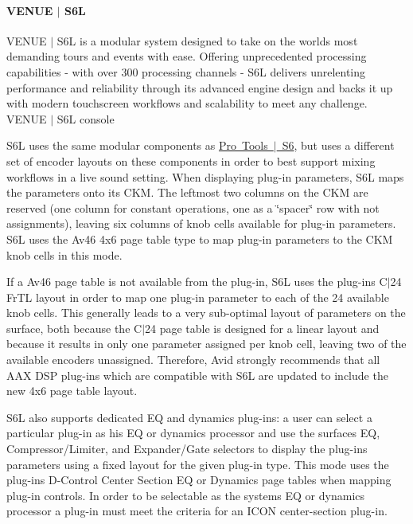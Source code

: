\hypertarget{a00833_subsubsection__venue_s6l}{}\paragraph{V\+E\+N\+U\+E $\vert$ S6L}\label{a00833_subsubsection__venue_s6l}
V\+E\+N\+UE $\vert$ S6L is a modular system designed to take on the world\textquotesingle{}s most demanding tours and events with ease. Offering unprecedented processing capabilities -\/ with over 300 processing channels -\/ S6L delivers unrelenting performance and reliability through its advanced engine design and backs it up with modern touchscreen workflows and scalability to meet any challenge.   V\+E\+N\+UE $\vert$ S6L console 

S6L uses the same modular components as \mbox{\hyperlink{a00833_subsubsection__avid_s6}{Pro Tools $\vert$ S6}}, but uses a different set of encoder layouts on these components in order to best support mixing workflows in a live sound setting. When displaying plug-\/in parameters, S6L maps the parameters onto its C\+KM. The leftmost two columns on the C\+KM are reserved (one column for constant operations, one as a \char`\"{}spacer\char`\"{} row with not assignments), leaving six columns of knob cells available for plug-\/in parameters. S6L uses the {\ttfamily \textquotesingle{}Av46\textquotesingle{}} 4x6 page table type to map plug-\/in parameters to the C\+KM knob cells in this mode.

If a {\ttfamily \textquotesingle{}Av46\textquotesingle{}} page table is not available from the plug-\/in, S6L uses the plug-\/in\textquotesingle{}s C$\vert$24 {\ttfamily \textquotesingle{}Fr\+TL\textquotesingle{}} layout in order to map one plug-\/in parameter to each of the 24 available knob cells. This generally leads to a very sub-\/optimal layout of parameters on the surface, both because the C$\vert$24 page table is designed for a linear layout and because it results in only one parameter assigned per knob cell, leaving two of the available encoders unassigned. Therefore, Avid strongly recommends that all A\+AX D\+SP plug-\/ins which are compatible with S6L are updated to include the new 4x6 page table layout.

S6L also supports dedicated EQ and dynamics plug-\/ins\+: a user can select a particular plug-\/in as his EQ or dynamics processor and use the surface\textquotesingle{}s EQ, Compressor/\+Limiter, and Expander/\+Gate selectors to display the plug-\/in\textquotesingle{}s parameters using a fixed layout for the given plug-\/in type. This mode uses the plug-\/in\textquotesingle{}s D-\/\+Control Center Section EQ or Dynamics page tables when mapping plug-\/in controls. In order to be selectable as the system\textquotesingle{}s EQ or dynamics processor a plug-\/in must meet the criteria for an I\+C\+ON center-\/section plug-\/in.

